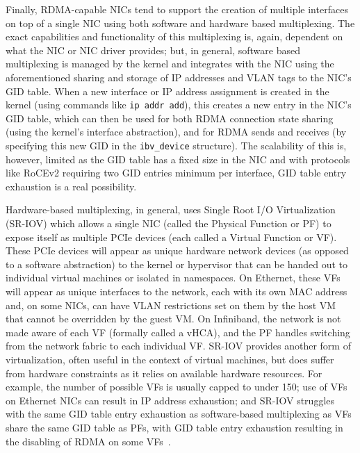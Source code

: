 \documentclass[12pt,titlepage]{article}
\begin{document}
Finally, RDMA-capable NICs tend to support the creation of multiple interfaces on top of a single NIC using both software and hardware based multiplexing.
The exact capabilities and functionality of this multiplexing is, again, dependent on what the NIC or NIC driver provides;
but, in general, software based multiplexing is managed by the kernel and integrates with the NIC using the aforementioned sharing and storage of IP addresses and VLAN tags to the NIC's GID table.
When a new interface or IP address assignment is created in the kernel (using commands like \texttt{ip addr add}), this creates a new entry in the NIC's GID table, which can then be used for both RDMA connection state sharing (using the kernel's interface abstraction), and for RDMA sends and receives (by specifying this new GID in the \texttt{ibv\_device} structure).
The scalability of this is, however, limited as the GID table has a fixed size in the NIC and with protocols like RoCEv2 requiring two GID entries minimum per interface, GID table entry exhaustion is a real possibility.

Hardware-based multiplexing, in general, uses Single Root I/O Virtualization (SR-IOV) which allows a single NIC (called the Physical Function or PF) to expose itself as multiple PCIe devices (each called a Virtual Function or VF).
These PCIe devices will appear as unique hardware network devices (as opposed to a software abstraction) to the kernel or hypervisor that can be handed out to individual virtual machines or isolated in namespaces.
On Ethernet, these VFs will appear as unique interfaces to the network, each with its own MAC address and, on some NICs, can have VLAN restrictions set on them by the host VM that cannot be overridden by the guest VM\@.
On Infiniband, the network is not made aware of each VF (formally called a vHCA), and the PF handles switching from the network fabric to each individual VF\@.
SR-IOV provides another form of virtualization, often useful in the context of virtual machines, but does suffer from hardware constraints as it relies on available hardware resources.
For example, the number of possible VFs is usually capped to under 150; use of VFs on Ethernet NICs can result in IP address exhaustion; and SR-IOV struggles with the same GID table entry exhaustion as software-based multiplexing as VFs share the same GID table as PFs, with GID table entry exhaustion resulting in the disabling of RDMA on some VFs~\cite{mlnxofedmanual}.
\end{document}
